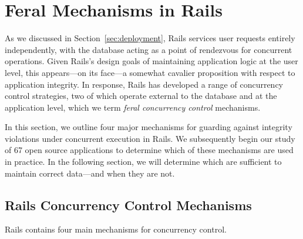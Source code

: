 
\section{Feral Mechanisms in Rails}
\label{sec:rails-cc}

As we discussed in Section~\ref{sec:deployment}, Rails services user
requests entirely independently, with the database acting as a point
of rendezvous for concurrent operations. Given Rails's design goals of
maintaining application logic at the user level, this appears---on its
face---a somewhat cavalier proposition with respect to application
integrity. In response, Rails has developed a range of concurrency
control strategies, two of which operate external to the database and
at the application level, which we term \textit{feral concurrency
  control} mechanisms.

In this section, we outline four major mechanisms for guarding against
integrity violations under concurrent execution in Rails. We
subsequently begin our study of 67 open source applications to
determine which of these mechanisms are used in practice. In the following
section, we will determine which are sufficient to maintain
correct data---and when they are not.

\subsection{Rails Concurrency Control Mechanisms}

Rails contains four main mechanisms for concurrency control.

